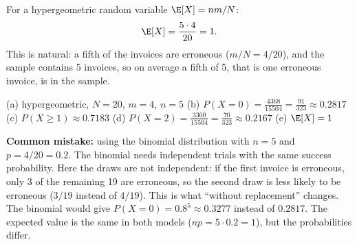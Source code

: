 \begin{solution}
	 For a hypergeometric random variable $\E[X]=nm/N$:
	\[ \E[X]=\frac{5\cdot4}{20}=1. \]
	This is natural: a fifth of the invoices are erroneous ($m/N=4/20$), and
	the sample contains 5 invoices, so on average a fifth of 5, that is one
	erroneous invoice, is in the sample.
	\begin{answer}
		(a) hypergeometric, $N=20$, $m=4$, $n=5$ \quad
		(b) $P(X=0)=\frac{4368}{15504}=\frac{91}{323}\approx0.2817$ \quad
		(c) $P(X\ge1)\approx0.7183$ \quad
		(d) $P(X=2)=\frac{3360}{15504}=\frac{70}{323}\approx0.2167$ \quad
		(e) $\E[X]=1$
	\end{answer}
	\begin{remark}
		\textbf{Common mistake:} using the binomial distribution with $n=5$ and
		$p=4/20=0.2$. The binomial needs independent trials with the same success
		probability. Here the draws are not independent: if the first invoice
		is erroneous, only 3 of the remaining 19 are erroneous, so the second
		draw is less likely to be erroneous ($3/19$ instead of $4/19$). This is
		what ``without replacement'' changes. The binomial would give
		$P(X=0)=0.8^5\approx0.3277$ instead of $0.2817$. The expected value is
		the same in both models ($np=5\cdot0.2=1$), but the probabilities differ.
	\end{remark}
\end{solution}
